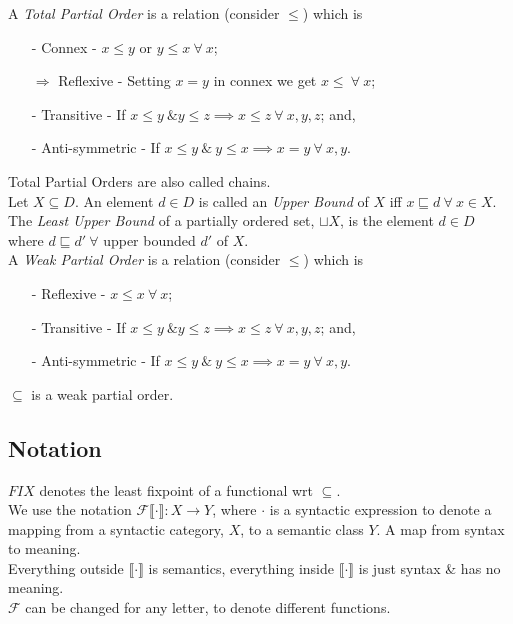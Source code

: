 \documentclass[11pt,a4paper]{article}
\begin{document}
A \textit{Total Partial Order} is a relation (consider $\leq$) which is
\begin{enumerate}[label=\roman*)]
	\item[-] Connex - $x\leq y$ or $y\leq x\ \forall\ x$;
	\item[$\Rightarrow$] Reflexive - Setting $x=y$ in connex we get $x\leq\ \forall\ x$;
	\item[-] Transitive - If $x\leq y\ \& y\leq z\implies x\leq z\ \forall\ x,y,z$; and,
	\item[-] Anti-symmetric - If $x\leq y\ \&\ y\leq x\implies x=y\ \forall\ x,y$.
\end{enumerate}
\NB Total Partial Orders are also called chains.\\

Let $X\subseteq D$. An element $d\in D$ is called an \textit{Upper Bound} of $X$ iff $x\sqsubseteq d\ \forall\ x\in X$.\\
The \textit{Least Upper Bound} of a partially ordered set, $\sqcup X$, is the element $d\in D$ where $d\sqsubseteq d'\ \forall$ upper bounded $d'$ of $X$.\\

A \textit{Weak Partial Order} is a relation (consider $\leq$) which is
\begin{enumerate}[label=\roman*)]
	\item[-] Reflexive - $x\leq x\ \forall\ x$;
	\item[-] Transitive - If $x\leq y\ \& y\leq z\implies x\leq z\ \forall\ x,y,z$; and,
	\item[-] Anti-symmetric - If $x\leq y\ \&\ y\leq x\implies x=y\ \forall\ x,y$.
\end{enumerate}
\NB $\subseteq$ is a weak partial order.

\subsection{Notation}

$FIX$ denotes the least fixpoint of a functional wrt $\subseteq$.\\

We use the notation $\mathcal{F}\llbracket \cdot\rrbracket:X\to Y$, where $\cdot$ is a syntactic expression to denote a mapping from a syntactic category, $X$, to a semantic class $Y$. \ie A map from syntax to meaning.\\
\NB Everything outside $\llbracket \cdot\rrbracket$ is semantics, everything inside $\llbracket \cdot\rrbracket$ is just syntax \& has no meaning.\\
\NB $\mathcal{F}$ can be changed for any letter, to denote different functions.\\
\end{document}
